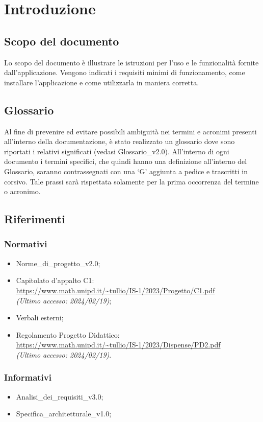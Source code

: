 \chapter{Introduzione} \label{cap:intro}

\section{Scopo del documento}
Lo scopo del documento è illustrare le istruzioni per l'uso e le funzionalità fornite dall'applicazione. Vengono indicati i requisiti minimi di funzionamento, come installare l'applicazione e come utilizzarla in maniera corretta.

\section{Glossario}
Al fine di prevenire ed evitare possibili ambiguità nei termini e acronimi presenti all’interno della documentazione, è stato realizzato un glossario dove sono riportati i relativi significati (vedasi Glossario\_v2.0). All’interno di ogni documento i termini specifici, che quindi hanno una definizione all’interno del Glossario, saranno contrassegnati con una ‘G’ aggiunta a pedice e trascritti in corsivo. Tale prassi sarà rispettata solamente per la prima occorrenza del termine o acronimo.

\section{Riferimenti}
\subsection{Normativi}
\begin{itemize}
    \item Norme\_di\_progetto\_v2.0;
    \item Capitolato d'appalto C1: \\ \url{https://www.math.unipd.it/~tullio/IS-1/2023/Progetto/C1.pdf} \\ \textit{(Ultimo accesso: 2024/02/19)};
    \item Verbali esterni;
    \item Regolamento Progetto Didattico: \\
    \url{https://www.math.unipd.it/~tullio/IS-1/2023/Dispense/PD2.pdf} \\ \textit{(Ultimo accesso: 2024/02/19)}.
\end{itemize}

\subsection{Informativi}
\begin{itemize}
    \item Analisi\_dei\_requisiti\_v3.0;
    \item Specifica\_architetturale\_v1.0;
\end{itemize}
